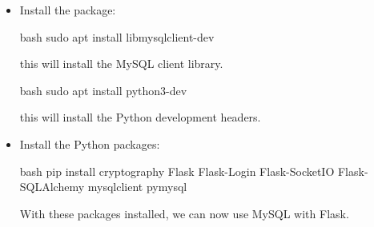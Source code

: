 \begin{itemize}
    \item Install the package:
    \begin{mintedbox}{bash}
sudo apt install libmysqlclient-dev
    \end{mintedbox}
    this will install the MySQL client library.
    \begin{mintedbox}{bash}
sudo apt install python3-dev
    \end{mintedbox}
    this will install the Python development headers.
    \item Install the Python packages:
    \begin{mintedbox}{bash}
pip install cryptography Flask Flask-Login Flask-SocketIO Flask-SQLAlchemy mysqlclient pymysql
    \end{mintedbox}
    With these packages installed, we can now use MySQL with Flask.
\end{itemize}
